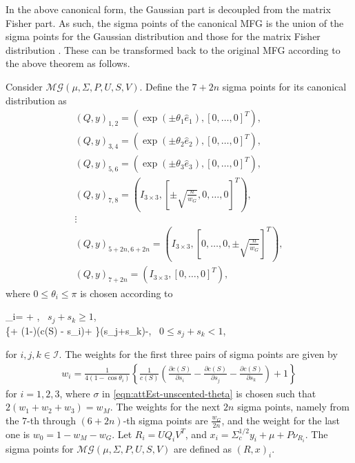 In the above canonical form, the Gaussian part is decoupled from the matrix Fisher part. 
As such, the sigma points of the canonical MFG is the union of the sigma points for the Gaussian distribution and those for the matrix Fisher distribution \cite{lee2018bayesian}.
These can be transformed back to the original MFG according to the above theorem as follows.

\begin{definition} \label{def:MFG-sigmaPoints}
	Consider $\mathcal{MG}(\mu,\Sigma,P,U,S,V)$.
	Define the $7+2n$ sigma points for its canonical distribution as
	\begin{gather} \label{eqn:attEst-unscented-sigmaPoints}
		({Q},y)_{1,2} = \left(\exp(\pm\theta_1\hat{e}_1),[0,\ldots,0]^T\right), \nonumber \\
		({Q},y)_{3,4} = \left(\exp(\pm\theta_2\hat{e}_2),[0,\ldots,0]^T\right), \nonumber \\
		({Q},y)_{5,6} = \left(\exp(\pm\theta_3\hat{e}_3),[0,\ldots,0]^T\right), \nonumber \\
		({Q},y)_{7,8} = \left(I_{3\times3},\left[\pm\sqrt{\frac{n}{w_G}},0,\ldots,0\right]^T\right), \nonumber \\
		\vdots \nonumber \\
		({Q},y)_{5+2n,6+2n} = \left(I_{3\times3},\left[0,\ldots,0,\pm\sqrt{\frac{n}{w_G}}\right]^T\right), \nonumber \\
		({Q},y)_{7+2n} = \left(I_{3\times3},[0,\ldots,0]^T\right),
	\end{gather}
	where $0\leq \theta_i\leq \pi$ is chosen according to
	\begin{subnumcases}{\cos\theta_i= \label{eqn:attEst-unscented-theta}}
		\sigma + ,\; \mbox{  $s_j+s_k\geq 1$},\\
		\left\{\sigma + (1-\sigma)(\log c(S) - s_i)+ \right\}(s_j+s_k)-,\; \mbox{  $0\leq s_j+s_k < 1$,}
	\end{subnumcases}
	for $i,j,k\in\mathcal{I}$.
	The weights for the first three pairs of sigma points are given by
	\begin{align}
		w_i = \frac{1}{4(1-\cos\theta_i)}\left\{\frac{1}{c(S)}\left(\frac{\partial c(S)}{\partial s_i}-\frac{\partial c(S)}{\partial s_j}-\frac{\partial c(S)}{\partial s_k}\right)+1\right\}
	\end{align}
	for $i=1,2,3$, where $\sigma$ in \eqref{eqn:attEst-unscented-theta} is chosen such that $2(w_1+w_2+w_3)=w_M$.
	The weights for the next $2n$ sigma points, namely from the $7$-th through $(6+2n)$-th sigma points are $\frac{w_G}{2n}$, and the weight for the last one is $w_0=1-w_M-w_G$.
	Let $R_i = U{Q}_iV^T$, and $x_i=\Sigma_c^{1/2}y_i+\mu+P\nu_{R_i}$.
	The sigma points for $\mathcal{MG}(\mu,\Sigma,P,U,S,V)$ are defined as $(R,x)_i$.
\end{definition}

